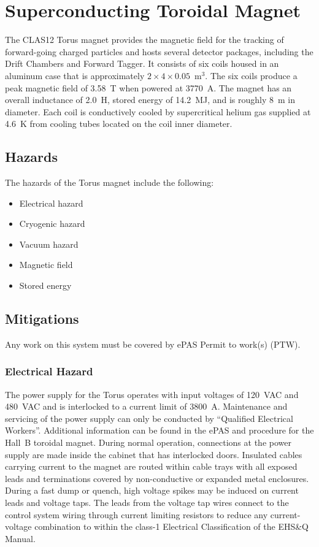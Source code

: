 \section{Superconducting Toroidal Magnet}

The CLAS12 Torus magnet provides the magnetic field for the tracking of forward-going
charged particles and hosts several detector packages, including the Drift Chambers 
and Forward Tagger. It consists of six coils housed in an aluminum case that is 
approximately $2 \times 4 \times 0.05$~m$^3$. The six coils produce a peak magnetic field 
of 3.58~T when powered at 3770~A. The magnet has an overall inductance of 2.0~H, stored 
energy of 14.2~MJ, and is roughly 8~m in diameter. Each coil is conductively cooled by 
supercritical helium gas supplied at 4.6~K from cooling tubes located on the coil inner 
diameter.

\subsection{Hazards} 

The hazards of the Torus magnet include the following:

\begin{itemize}
\item Electrical hazard
\item Cryogenic hazard
\item Vacuum hazard
\item Magnetic field
\item Stored energy
\end{itemize}

\subsection{Mitigations}
Any work on this system must be covered by ePAS Permit to work(s) (PTW).

\subsubsection{Electrical Hazard}

The power supply for the Torus operates with input voltages of 120~VAC and 480~VAC and is 
interlocked to a current limit of 3800~A. Maintenance and servicing of the power supply can 
only be conducted by ``Qualified Electrical Workers''. Additional information can be found 
in the ePAS and procedure for the Hall~B toroidal magnet. During normal operation, connections at the
power supply are made inside the cabinet that has interlocked doors. Insulated cables 
carrying current to the magnet are routed within cable trays with all exposed leads and 
terminations covered by non-conductive or expanded metal enclosures. During a fast dump or 
quench, high voltage spikes may be induced on current leads and voltage taps. The leads from
the voltage tap wires connect to the control system wiring through current limiting resistors 
to reduce any current-voltage combination to within the class-1 Electrical Classification of 
the EHS\&Q Manual.

